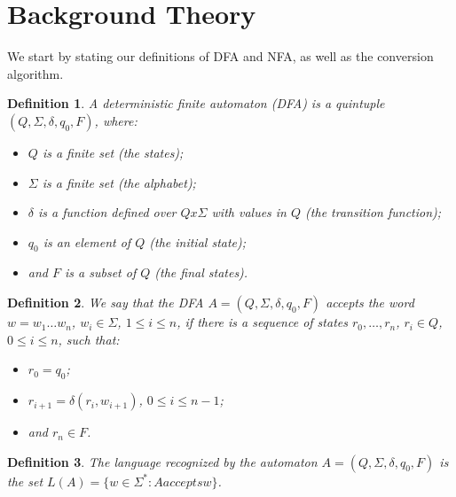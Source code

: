 \documentclass[12pt, a4paper]{article}
\theoremstyle{break}
\newtheorem{definition}{Definition}
\begin{document}




\section{Background Theory}

We start by stating our definitions of DFA and NFA, as well as the conversion
algorithm.

\begin{definition}
  A deterministic finite automaton (DFA) is a quintuple
$(Q,\Sigma,\delta,q_0,F)$, where:
\begin{itemize}
  \item $Q$ is a finite set (the states);
  \item $\Sigma$ is a finite set (the alphabet);
  \item $\delta$ is a function defined over $Q x \Sigma$ with values in $Q$ (the transition
     function);
  \item $q_0$ is an element of $Q$ (the initial state);
  \item and $F$ is a subset of $Q$ (the final states).
\end{itemize}
\end{definition}

\begin{definition}
    We say that the DFA $A = (Q,\Sigma,\delta,q_0,F)$ accepts the word $w = w_1
\ldots w_n$, $w_i \in \Sigma$, $ 1 \leq i \leq n$, if there is a sequence of
states $r_0, \ldots, r_n$, $r_i \in Q$, $0 \leq i \leq n$, such that:
\begin{itemize}
  \item $r_0 = q_0$;
  \item $r_{i+1} = \delta(r_i, w_{i+1})$, $0 \leq i \leq n-1$;
  \item and $r_n \in F$.
\end{itemize}
\end{definition}

\begin{definition}
  The language recognized by the automaton $A = (Q,\Sigma,\delta,q_0,F)$ is the
set $L(A) = \{w \in \Sigma^* : A accepts w\}$.
\end{definition}
\end{document}
